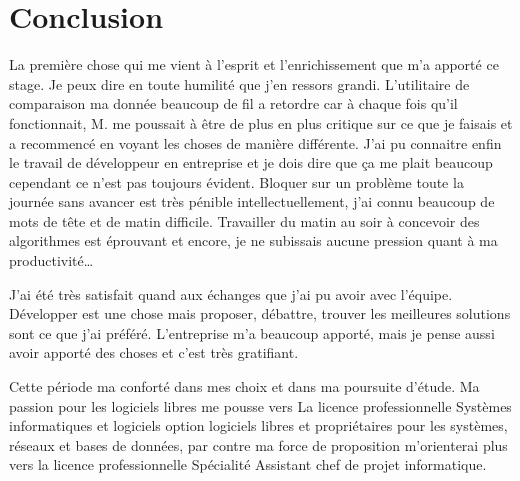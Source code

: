 \chapter{Conclusion}

La première chose qui me vient à l'esprit et l'enrichissement que m'a apporté
ce stage. Je peux dire en toute humilité que j'en ressors grandi. L'utilitaire
de comparaison ma donnée beaucoup de fil a retordre car à chaque fois qu'il
fonctionnait, M. me poussait à être de plus en plus critique sur
ce que je faisais et a recommencé en voyant les choses de manière différente.
J'ai pu connaitre enfin le travail de développeur en entreprise et je dois dire
que ça me plait beaucoup cependant ce n'est pas toujours évident. Bloquer sur
un problème toute la journée sans avancer est très pénible intellectuellement,
j'ai connu beaucoup de mots de tête et de matin difficile. Travailler du matin
au soir à concevoir des algorithmes est éprouvant et encore, je ne subissais
aucune pression quant à ma productivité\dots

J'ai été très satisfait quand aux échanges que j'ai pu avoir avec l'équipe.
Développer est une chose mais proposer, débattre, trouver les meilleures
solutions sont ce que j'ai préféré. L'entreprise m'a beaucoup apporté, mais je
pense aussi avoir apporté des choses et c'est très gratifiant.

Cette période ma conforté dans mes choix et dans ma poursuite d'étude. Ma
passion pour les logiciels libres me pousse vers La licence professionnelle
Systèmes informatiques et logiciels option logiciels libres et propriétaires
pour les systèmes, réseaux et bases de données, par contre ma force de
proposition m'orienterai plus vers la licence professionnelle Spécialité
Assistant chef de projet informatique.
